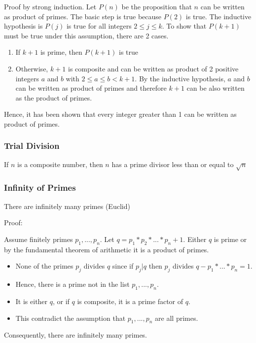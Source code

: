 \documentclass{article}
\begin{document}
\begin{tcolorbox}
Proof by strong induction. Let $ P(n) $ be the proposition that $ n $ can be written as product of primes. The basic step is true because $ P(2) $ is true. The inductive hypothesis is $ P(j) $ is true for all integers $ 2 \leq j \leq k $. To show that $ P(k+1) $ must be true under this assumption, there are 2 cases.
\begin{enumerate}
\item If $ k + 1 $ is prime, then $ P(k+1) $ is true
\item Otherwise, $ k + 1 $ is composite and can be written as product of 2 positive integers $  a $ and $ b $ with $ 2 \leq a \leq b < k + 1 $. By the inductive hypothesis, $ a $ and $ b $ can be written as product of primes and therefore $ k + 1 $ can be also written as the product of primes.
\end{enumerate}
Hence, it has been shown that every integer greater than 1 can be written as product of primes.
\end{tcolorbox}

\subsubsection{Trial Division}
\begin{tcolorbox}[sharp corners, colback=green!30, colframe=green!80!blue, title=Trial Division]
If $ n $ is a composite number, then $ n $ has a prime divisor less than or equal to $ \sqrt{n} $
\end{tcolorbox}

\subsubsection{Infinity of Primes}
\begin{tcolorbox}[sharp corners, colback=green!30, colframe=green!80!blue, title=Infinity of Primes]
There are infinitely many primes (Euclid)
\end{tcolorbox}
Proof:

\begin{tcolorbox}
Assume finitely primes $ p_1,...,p_n $. Let $ q = p_1*p_2*...*p_n + 1 $. Either $ q $ is prime or by the fundamental theorem of arithmetic it is a product of primes.
\begin{itemize}
\item None of the primes $ p_j $ divides $ q $ since if $ p_j|q $ then $ p_j $ divides $ q - p_1*...*p_n = 1 $.
\item Hence, there is a prime not in the list $ p_1,...,p_n $.
\item It is either $ q $, or if $ q $ is composite, it is a prime factor of $ q $.
\item This contradict the assumption that $ p_1,...,p_n $ are all primes.
\end{itemize}
Consequently, there are infinitely many primes.
\end{tcolorbox}
\end{document}
